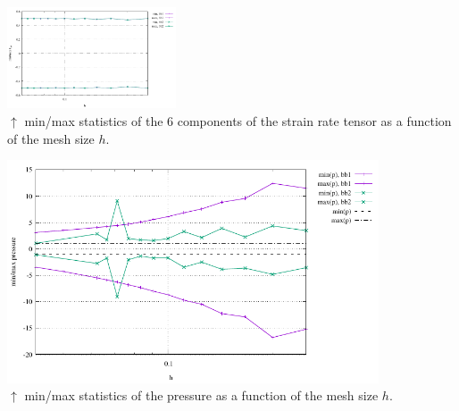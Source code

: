 \begin{center}
\includegraphics[width=5cm]{python_codes/fieldstone_75/results/mms3D/eyz_stats.pdf}\\
{\captionfont $\uparrow$ min/max statistics of the 6 components of the strain rate tensor
as a function of the mesh size $h$.}
\end{center}


\begin{center}
\includegraphics[width=11cm]{python_codes/fieldstone_75/results/mms3D/p_stats.pdf}\\
{\captionfont $\uparrow$ min/max statistics of the pressure as a function of the mesh size $h$.}
\end{center}


